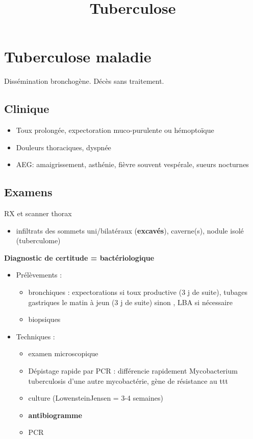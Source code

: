\documentclass[a4paper,11pt,twoside,twocolumn]{article}
\date{}
\title{Tuberculose}
\begin{document}
\def\dec{$\searrow{}$}
\def\inc{$\nearrow{}$}


\titlespacing*{\subsection}{0pt}{1ex}{1.3ex}
\titlespacing*{\subsubsection}{0pt}{0.5ex}{0.5ex}
\section*{Tuberculose maladie}
\label{sec:orga73a050}
Dissémination bronchogène. Décès sans traitement.
\subsection*{Clinique}
\label{sec:org16afab4}
\begin{itemize}
\item Toux prolongée, expectoration muco-purulente ou hémoptoïque
\item \textpm{} Douleurs thoraciques, dyspnée
\item AEG: amaigrissement, asthénie, fièvre souvent vespérale, sueurs nocturnes
\end{itemize}
\subsection*{Examens}
\label{sec:org8d29c62}
RX et scanner thorax
\begin{itemize}
\item infiltrats des sommets uni/bilatéraux (\textbf{\textbf{excavés}}), caverne(s), nodule isolé (tuberculome)
\end{itemize}

\textbf{\textbf{Diagnostic de certitude = bactériologique}}
\begin{itemize}
\item Prélèvements :
\begin{itemize}
\item bronchiques : expectorations si toux productive (3 j de suite), tubages gastriques le matin à jeun (3 j de suite) sinon , LBA si nécessaire
\item biopsiques
\end{itemize}
\item Techniques :
\begin{itemize}
\item examen microscopique
\item Dépistage rapide par PCR : différencie rapidement Mycobacterium tuberculosis d'une autre mycobactérie, gène de résistance au ttt
\item culture (Lowenstein­Jensen = 3-4 semaines)
\item \textbf{\textbf{antibiogramme}}
\item PCR
\end{itemize}
\end{itemize}
\end{document}

